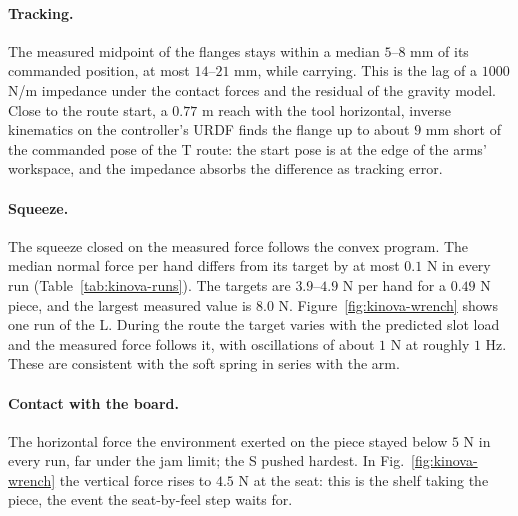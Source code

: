 \paragraph{Tracking.} The measured midpoint of the flanges stays within a median $5$--$8$ mm of its commanded position, at most $14$--$21$ mm, while carrying. This is the lag of a $1000$ N/m impedance under the contact forces and the residual of the gravity model. Close to the route start, a $0.77$ m reach with the tool horizontal, inverse kinematics on the controller's URDF finds the flange up to about $9$ mm short of the commanded pose of the T route: the start pose is at the edge of the arms' workspace, and the impedance absorbs the difference as tracking error.

\paragraph{Squeeze.} The squeeze closed on the measured force follows the convex program. The median normal force per hand differs from its target by at most $0.1$ N in every run (Table~\ref{tab:kinova-runs}). The targets are $3.9$--$4.9$ N per hand for a $0.49$ N piece, and the largest measured value is $8.0$ N. Figure~\ref{fig:kinova-wrench} shows one run of the L. During the route the target varies with the predicted slot load and the measured force follows it, with oscillations of about $1$ N at roughly $1$ Hz. These are consistent with the soft spring in series with the arm.


\paragraph{Contact with the board.} The horizontal force the environment exerted on the piece stayed below $5$ N in every run, far under the jam limit; the S pushed hardest. In Fig.~\ref{fig:kinova-wrench} the vertical force rises to $4.5$ N at the seat: this is the shelf taking the piece, the event the seat-by-feel step waits for.

